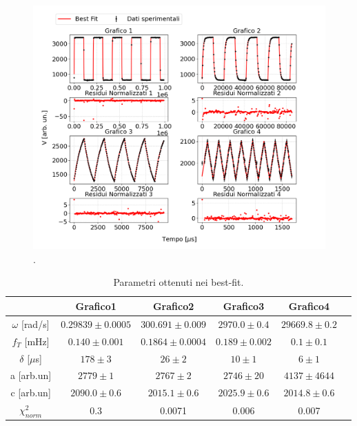 \documentclass{article}
\begin{document}
                \begin{figure}[H]
                    \centering
                    \includegraphics[width=1\textwidth]{bestfit_sharkfins.png} %
                    \caption{.
                    }
                    \label{fig:bestfit_shark.fig}
                \end{figure}     

                \begin{table}[H]
                    \centering
                    \begin{tabular}{cccccc}
                        \hline
                         & Grafico1 & Grafico2 & Grafico3 & Grafico4 \\
                        \hline
                        $\omega$ [rad/s]    & $0.29839 \pm 0.0005$      & $300.691\pm 0.009$    & $2970.0 \pm 0.4$      & $29669.8\pm 0.2$ \\
                        $f_T$ [mHz]         & $0.140 \pm 0.001$         & $0.1864 \pm 0.0004$   & $0.189 \pm 0.002$     & $0.1 \pm 0.1$ \\
                        $\delta$ [$\mu$s]   & $178 \pm 3$               & $26 \pm 2$            & $10\pm 1$             & $6 \pm 1$ \\
                        a [arb.un]          & $2779\pm 1$               & $2767 \pm 2$          & $2746\pm 20$          & $4137\pm 4644$ \\
                        c [arb.un]          & $2090.0 \pm 0.6 $         &$2015.1\pm 0.6$        & $2025.9 \pm 0.6$      & $2014.8 \pm 0.6$ \\
                        $\chi^{2}_{norm}$   & 0.3                       &0.0071                 & 0.006                 & 0.007\\
                        \hline
                    \end{tabular}
                    \caption{Parametri ottenuti nei best-fit.}
                    \label{tab:bestfit_params}
                \end{table}
  
\end{document}
